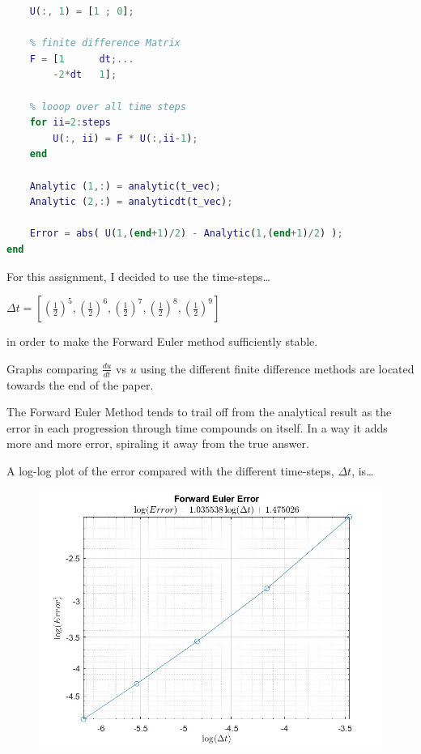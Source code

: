 \documentclass[12pt,letterpaper]{article}
\begin{document}
\begin{enumerate}
\begin{lstlisting}[language = Matlab]
    % Set initial condition
    U(:, 1) = [1 ; 0];
    
    % finite difference Matrix
    F = [1      dt;...
        -2*dt   1];
    
    % looop over all time steps
    for ii=2:steps
        U(:, ii) = F * U(:,ii-1);
    end
    
    Analytic (1,:) = analytic(t_vec);
    Analytic (2,:) = analyticdt(t_vec);

    Error = abs( U(1,(end+1)/2) - Analytic(1,(end+1)/2) );
end
\end{lstlisting}


For this assignment, I decided to use the time-steps\ldots

\begin{center} 
    $\Delta t = \left[\left(\frac{1}{2}\right)^{5}, \left(\frac{1}{2}\right)^{6}, \left(\frac{1}{2}\right)^{7}, \left(\frac{1}{2}\right)^{8}, \left(\frac{1}{2}\right)^{9} \right] $
\end{center}
in order to make the Forward Euler method sufficiently stable.

Graphs comparing $\frac{du}{dt}$ vs $u$ using the different finite difference methods are located towards the end of the paper.

The Forward Euler Method tends to trail off from the analytical result as the error in each progression through time compounds on itself. In a way it adds more and more error, spiraling it away from the true answer.


\newpage
A log-log plot of the error compared with the different time-steps, $\Delta t$, is\ldots

\begin{figure}[!h]
    \centering
    \includegraphics[width = 1\linewidth]{forward_error.jpg}
\end{figure}


\end{enumerate}
\end{document}
